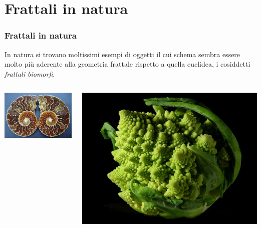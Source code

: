 \documentclass{beamer}
\begin{document}
	\section{Frattali in natura}
		\begin{frame}
			\frametitle{Frattali in natura}
			In natura si trovano moltissimi esempi di oggetti il cui schema sembra essere molto più aderente alla geometria frattale rispetto a quella euclidea, i cosiddetti \textit{frattali biomorfi}.
			\bigskip
			\begin{columns}
				\begin{column}{0.25\textwidth}
					\begin{center}
						\includegraphics[width=1\linewidth]{"../Frattali in natura/ammoniti"}
					\end{center}
				\end{column}
				\begin{column}{0.25\textwidth}
					\begin{center}
						\includegraphics[width=1\linewidth]{"../Frattali in natura/Fractal_Broccoli"}

\end{center}
\end{column}
\end{columns}
\end{frame}
\end{document}

